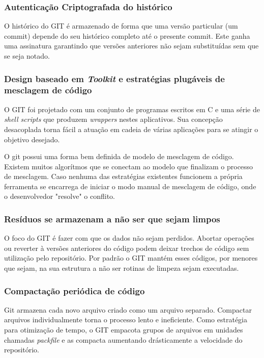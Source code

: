 \documentclass[
	article,			%
	12pt,				%
	oneside,			%
	a4paper,			%
	english,			
	brazil,
	sumario=tradicional
	]{abntex2}
\begin{document}
\subsubsection{Autenticação Criptografada do histórico}
O histórico do GIT é armazenado de forma que uma versão particular (um commit) depende do seu histórico completo até o presente commit. Este ganha uma assinatura garantindo que versões anteriores não sejam substituídas sem que se seja notado.

\subsubsection{Design baseado em \textit{Toolkit} e estratégias plugáveis de mesclagem de código}
O GIT foi projetado com um conjunto de programas escritos em C e uma série de \textit{shell scripts} que produzem \textit{wrappers} nestes aplicativos. Sua concepção desacoplada torna fácil a atuação em cadeia de várias aplicações para se atingir o objetivo desejado.

O git possui uma forma bem definida de modelo de mesclagem de código. Existem muitos algorítmos que se conectam ao modelo que finalizam o processo de mesclagem. Caso nenhuma das estratégias existentes funcionem a própria ferramenta se encarrega de iniciar o modo manual de mesclagem de código, onde o desenvolvedor "resolve" o conflito.

\subsubsection{Resíduos se armazenam a não ser que sejam limpos}
O foco do GIT é fazer com que os dados não sejam perdidos. Abortar operações ou reverter à versões anteriores do código podem deixar trechos de código sem utilização pelo repositório. Por padrão o GIT mantém esses códigos, por menores que sejam, na sua estrutura a não ser rotinas de limpeza sejam executadas.

\subsubsection{Compactação periódica de código}
Git armazena cada novo arquivo criado como um arquivo separado. Compactar arquivos individualmente torna o processo lento e ineficiente. Como estratégia para otimização de tempo, o GIT empacota grupos de arquivos em unidades chamadas \textit{packfile} e as compacta aumentando drásticamente a velocidade do repositório.

\pagebreak
\end{document}
